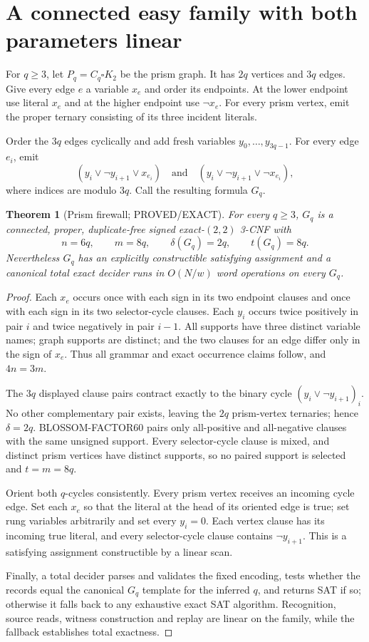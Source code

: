 \documentclass[11pt]{article}
\newtheorem{theorem}{Theorem}
\begin{document}
\section{A connected easy family with both parameters linear}
For $q\ge3$, let $P_q=C_q\square K_2$ be the prism graph.  It has
$2q$ vertices and $3q$ edges.  Give every edge $e$ a variable $x_e$ and
order its endpoints.  At the lower endpoint use literal $x_e$ and at the
higher endpoint use $\neg x_e$.  For every prism vertex, emit the proper
ternary consisting of its three incident literals.

Order the $3q$ edges cyclically and add fresh variables
$y_0,\ldots,y_{3q-1}$.  For every edge $e_i$, emit
\[
(y_i\vee\neg y_{i+1}\vee x_{e_i})\quad\text{and}\quad
(y_i\vee\neg y_{i+1}\vee\neg x_{e_i}),
\]
where indices are modulo $3q$.  Call the resulting formula $G_q$.

\begin{theorem}[Prism firewall; PROVED/EXACT]
For every $q\ge3$, $G_q$ is a connected, proper, duplicate-free signed
exact-$(2,2)$ 3-CNF with
\[
n=6q,\qquad m=8q,\qquad
\delta(G_q)=2q,\qquad t(G_q)=8q.
\]
Nevertheless $G_q$ has an explicitly constructible satisfying assignment
and a canonical total exact decider runs in $O(N/w)$ word operations on
every $G_q$.
\end{theorem}
\begin{proof}
Each $x_e$ occurs once with each sign in its two endpoint clauses and once
with each sign in its two selector-cycle clauses.  Each $y_i$ occurs twice
positively in pair $i$ and twice negatively in pair $i-1$.  All supports
have three distinct variable names; graph supports are distinct; and the
two clauses for an edge differ only in the sign of $x_e$.  Thus all grammar
and exact occurrence claims follow, and $4n=3m$.

The $3q$ displayed clause pairs contract exactly to the binary cycle
$(y_i\vee\neg y_{i+1})_i$.  No other complementary pair exists, leaving
the $2q$ prism-vertex ternaries; hence $\delta=2q$.  BLOSSOM-FACTOR60 pairs
only all-positive and all-negative clauses with the same unsigned support.
Every selector-cycle clause is mixed, and distinct prism vertices have
distinct supports, so no paired support is selected and $t=m=8q$.

Orient both $q$-cycles consistently.  Every prism vertex receives an
incoming cycle edge.  Set each $x_e$ so that the literal at the head of its
oriented edge is true; set rung variables arbitrarily and set every $y_i=0$.
Each vertex clause has its incoming true literal, and every selector-cycle
clause contains $\neg y_{i+1}$.  This is a satisfying assignment constructible
by a linear scan.

Finally, a total decider parses and validates the fixed encoding, tests
whether the records equal the canonical $G_q$ template for the inferred
$q$, and returns SAT if so; otherwise it falls back to any exhaustive exact
SAT algorithm.  Recognition, source reads, witness construction and replay
are linear on the family, while the fallback establishes total exactness.
\end{proof}
\end{document}
